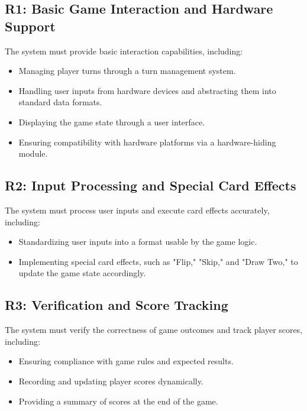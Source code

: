 \documentclass[12pt, titlepage]{article}
\begin{document}

\subsection{R1: Basic Game Interaction and Hardware Support}
The system must provide basic interaction capabilities, including:
\begin{itemize}
    \item Managing player turns through a turn management system.
    \item Handling user inputs from hardware devices and abstracting them into standard data formats.
    \item Displaying the game state through a user interface.
    \item Ensuring compatibility with hardware platforms via a hardware-hiding module.
\end{itemize}

\subsection{R2: Input Processing and Special Card Effects}
The system must process user inputs and execute card effects accurately, including:
\begin{itemize}
    \item Standardizing user inputs into a format usable by the game logic.
    \item Implementing special card effects, such as "Flip," "Skip," and "Draw Two," to update the game state accordingly.
\end{itemize}

\subsection{R3: Verification and Score Tracking}
The system must verify the correctness of game outcomes and track player scores, including:
\begin{itemize}
    \item Ensuring compliance with game rules and expected results.
    \item Recording and updating player scores dynamically.
    \item Providing a summary of scores at the end of the game.
\end{itemize}
\end{document}
